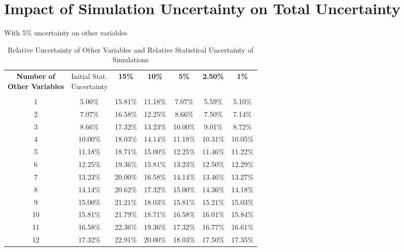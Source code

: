 \chapter{Impact of Simulation Uncertainty on Total Uncertainty}\label{app:f}

With 5\% uncertainty on other variables
\begin{table}[htb]
    \centering
    \begin{tabular}{c|cccccc}
        \headercell{\textbf{Number of} \\ \textbf{Other Variables}} & \headercell{Initial Stat. \\ Uncertainty} & \textbf{15\%} & \textbf{10\%} & \textbf{5\%} & \textbf{2.50\%} & \textbf{1\%} \\ \\ \hline
        1 & 5.00\% & 15.81\% & 11.18\% & 7.07\% & 5.59\% & 5.10\% \\
        2 & 7.07\% & 16.58\% & 12.25\% & 8.66\% & 7.50\% & 7.14\% \\
        3 & 8.66\% & 17.32\% & 13.23\% & 10.00\% & 9.01\% & 8.72\% \\
        4 & 10.00\% & 18.03\% & 14.14\% & 11.18\% & 10.31\% & 10.05\% \\
        5 & 11.18\% & 18.71\% & 15.00\% & 12.25\% & 11.46\% & 11.22\% \\
        6 & 12.25\% & 19.36\% & 15.81\% & 13.23\% & 12.50\% & 12.29\% \\
        7 & 13.23\% & 20.00\% & 16.58\% & 14.14\% & 13.46\% & 13.27\% \\
        8 & 14.14\% & 20.62\% & 17.32\% & 15.00\% & 14.36\% & 14.18\% \\
        9 & 15.00\% & 21.21\% & 18.03\% & 15.81\% & 15.21\% & 15.03\% \\
        10 & 15.81\% & 21.79\% & 18.71\% & 16.58\% & 16.01\% & 15.84\% \\
        11 & 16.58\% & 22.36\% & 19.36\% & 17.32\% & 16.77\% & 16.61\% \\
        12 & 17.32\% & 22.91\% & 20.00\% & 18.03\% & 17.50\% & 17.35\% \\
    \end{tabular}
    \caption{Relative Uncertainty of Other Variables and Relative Statistical Uncertainty of Simulations}
    \label{table:uncertainties}
\end{table}



